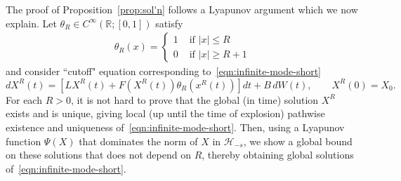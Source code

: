 \documentclass[11pt]{amsart}
\theoremstyle{definition}
\newcommand{\rbb}{\mathbb{R}}
\renewcommand{\H}{\mathcal{H}}
\theoremstyle{definition}
\theoremstyle{plain}
\numberwithin{equation}{section}
\begin{document}
The proof of Proposition~\ref{prop:sol'n} follows a Lyapunov argument which we now explain.  Let $\theta_R\in C^\infty(\rbb ; [0,1])$  satisfy
\begin{align} \label{defn:theta-R}
\theta_R(x) = \begin{cases}
1 & \text{ if } |x| \leq R \\
0 & \text{ if } |x| \geq R+1
\end{cases}
\end{align}
and consider ``cutoff" equation corresponding to~\eqref{eqn:infinite-mode-short}
\begin{equation}\label{eqn:infinite-mode-short-cut}
d X^R(t) = \left[LX^R(t)+F\left(X^R(t)\right)\theta_R\left(x^R(t)\right)\right]d t+B \, d W(t),\qquad X^R(0)=X_0 .  
\end{equation}
For each $R>0$, it is not hard to prove that the global (in time) solution $X^R$ exists and is unique, giving local (up until the time of explosion) pathwise existence and uniqueness of~\eqref{eqn:infinite-mode-short}.  Then, using a Lyapunov function $\Psi(X)$ that dominates the norm of $X$ in $\H_{-s}$, we show a global bound on these solutions that does not depend on $R$, thereby obtaining global solutions of~\eqref{eqn:infinite-mode-short}.
\end{document}
